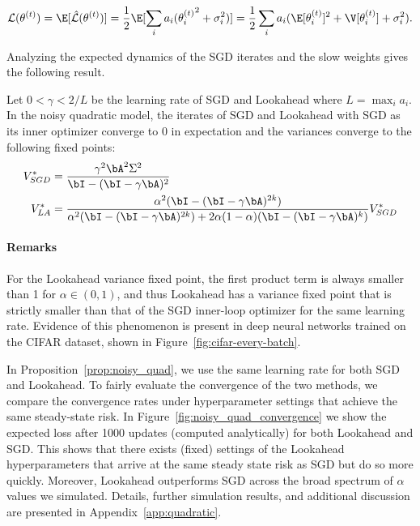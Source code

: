 \begin{equation}\label{eqn:noisy_exp_loss}
    \mathcal{L}(\theta^{(t)}) = \E[\hat{\mathcal{L}}(\theta^{(t)})]
    = \frac{1}{2} \E [\sum_i a_i ({\theta_i^{(t)}}^2 + \sigma_i^2)]
    = \frac{1}{2}\sum_i a_i (\E[\theta_i^{(t)}]^2 + \V[\theta_i^{(t)}] + \sigma_i^2).
\end{equation}

Analyzing the expected dynamics of the SGD iterates and the slow weights gives the following result.



\begin{proposition}\label{prop:noisy_quad}
Let $0 < \gamma < 2/L$ be the learning rate of SGD and Lookahead where $L=\max_i a_i$. In the noisy quadratic model, the iterates of SGD and Lookahead with SGD as its inner optimizer converge to $0$ in expectation and the variances converge to the following fixed points:
\begin{align}
    V_{SGD}^* &= \frac{\gamma^2 \bA^2 \Sigma^2}{\bI - (\bI - \gamma \bA)^2} \\
    V_{LA}^* &= \frac{\alpha^2 (\bI - (\bI - \gamma\bA)^{2k})}{\alpha^2 (\bI - (\bI - \gamma\bA)^{2k}) + 2\alpha(1 - \alpha)(\bI - (\bI - \gamma\bA)^k)} V_{SGD}^*
\end{align}
\end{proposition}


\paragraph{Remarks}For the Lookahead variance fixed point, the first product term is always smaller than 1 for $\alpha \in (0,1)$, and thus Lookahead has a variance fixed point that is strictly smaller than that of the SGD inner-loop optimizer for the same learning rate. Evidence of this phenomenon is present in deep neural networks trained on the CIFAR dataset, shown in Figure~\ref{fig:cifar-every-batch}.



In Proposition~\ref{prop:noisy_quad}, we use the same learning rate for both SGD and Lookahead. To fairly evaluate the convergence of the two methods, we compare the convergence rates under hyperparameter settings that achieve the same steady-state risk. In Figure~\ref{fig:noisy_quad_convergence} we show the expected loss after 1000 updates (computed analytically) for both Lookahead and SGD. This shows that there exists (fixed) settings of the Lookahead hyperparameters that arrive at the same steady state risk as SGD but do so more quickly. Moreover, Lookahead outperforms SGD across the broad spectrum of $\alpha$ values we simulated. Details, further simulation results, and additional discussion are presented in Appendix~\ref{app:quadratic}.

